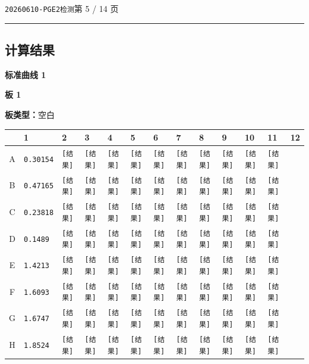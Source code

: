 \documentclass[UTF8,10pt,a4paper,fontset=fandol]{ctexart}
\begin{document}

\newpage

\begin{flushleft}
\texttt{20260610-PGE2检测}\hfill 第 5 / 14 页
\end{flushleft}

\hrule

\subsection*{计算结果}
\textbf{标准曲线 1}

\textbf{板 1}

\textbf{板类型：}空白

\begin{center}
\scriptsize
\setlength{\tabcolsep}{2pt}
\begin{tabular}{c|*{12}{p{0.57cm}|}}
 & 1 & 2 & 3 & 4 & 5 & 6 & 7 & 8 & 9 & 10 & 11 & 12\\ \hline
A & \texttt{0.30154} & \texttt{[结果]} & \texttt{[结果]} & \texttt{[结果]} &
\texttt{[结果]} & \texttt{[结果]} & \texttt{[结果]} & \texttt{[结果]} &
\texttt{[结果]} & \texttt{[结果]} & \texttt{[结果]} & \\ \hline
B & \texttt{0.47165} & \texttt{[结果]} & \texttt{[结果]} & \texttt{[结果]} &
\texttt{[结果]} & \texttt{[结果]} & \texttt{[结果]} & \texttt{[结果]} &
\texttt{[结果]} & \texttt{[结果]} & \texttt{[结果]} & \\ \hline
C & \texttt{0.23818} & \texttt{[结果]} & \texttt{[结果]} & \texttt{[结果]} &
\texttt{[结果]} & \texttt{[结果]} & \texttt{[结果]} & \texttt{[结果]} &
\texttt{[结果]} & \texttt{[结果]} & \texttt{[结果]} & \\ \hline
D & \texttt{0.1489} & \texttt{[结果]} & \texttt{[结果]} & \texttt{[结果]} &
\texttt{[结果]} & \texttt{[结果]} & \texttt{[结果]} & \texttt{[结果]} &
\texttt{[结果]} & \texttt{[结果]} & \texttt{[结果]} & \\ \hline
E & \texttt{1.4213} & \texttt{[结果]} & \texttt{[结果]} & \texttt{[结果]} &
\texttt{[结果]} & \texttt{[结果]} & \texttt{[结果]} & \texttt{[结果]} &
\texttt{[结果]} & \texttt{[结果]} & \texttt{[结果]} & \\ \hline
F & \texttt{1.6093} & \texttt{[结果]} & \texttt{[结果]} & \texttt{[结果]} &
\texttt{[结果]} & \texttt{[结果]} & \texttt{[结果]} & \texttt{[结果]} &
\texttt{[结果]} & \texttt{[结果]} & \texttt{[结果]} & \\ \hline
G & \texttt{1.6747} & \texttt{[结果]} & \texttt{[结果]} & \texttt{[结果]} &
\texttt{[结果]} & \texttt{[结果]} & \texttt{[结果]} & \texttt{[结果]} &
\texttt{[结果]} & \texttt{[结果]} & \texttt{[结果]} & \\ \hline
H & \texttt{1.8524} & \texttt{[结果]} & \texttt{[结果]} & \texttt{[结果]} &
\texttt{[结果]} & \texttt{[结果]} & \texttt{[结果]} & \texttt{[结果]} &
\texttt{[结果]} & \texttt{[结果]} & \texttt{[结果]} & \\ \hline
\end{tabular}
\end{center}
\end{document}

